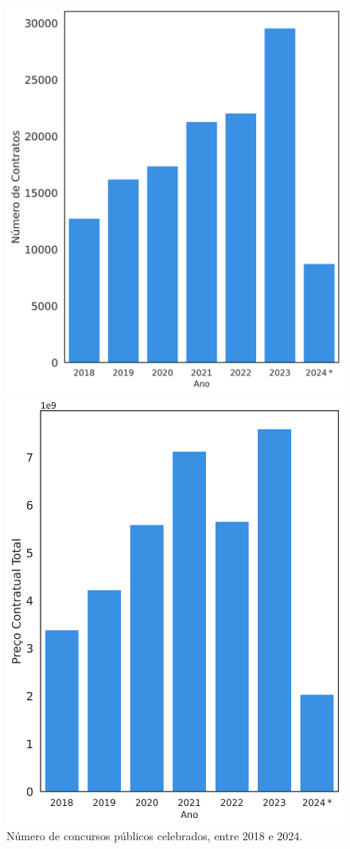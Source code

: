 \begin{figure}[H]
	\hfill
	\begin{minipage}{.31\linewidth}
		\includegraphics[width=\linewidth]{imagens/cpub_nrcontr.png}
		\caption{Número de concursos públicos celebrados, entre 2018 e 2024.}
		\label{fig:precocps1}
	\end{minipage}
	\hfill
	\begin{minipage}{.31\linewidth}
		\includegraphics[width=\linewidth]{imagens/cpub_price.png}

\end{minipage}
\end{figure}
